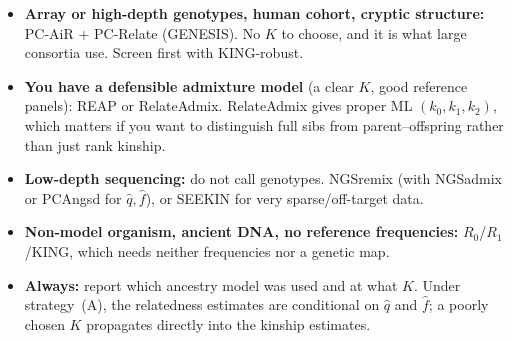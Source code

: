 \documentclass[10pt,a4paper]{article}
\newenvironment{tightitem}{%
  \begin{itemize}\setlength{\itemsep}{1pt}\setlength{\parskip}{0pt}%
  \setlength{\topsep}{3pt}\setlength{\parsep}{0pt}}{\end{itemize}}
\begin{document}
\begin{tightitem}
  \item \textbf{Array or high-depth genotypes, human cohort, cryptic structure:} PC-AiR + PC-Relate
  (GENESIS). No $K$ to choose, and it is what large consortia use. Screen first with KING-robust.
  \item \textbf{You have a defensible admixture model} (a clear $K$, good reference panels): REAP or
  RelateAdmix. RelateAdmix gives proper ML $(k_0,k_1,k_2)$, which matters if you want to distinguish
  full sibs from parent--offspring rather than just rank kinship.
  \item \textbf{Low-depth sequencing:} do not call genotypes. NGSremix (with NGSadmix or PCAngsd for
  $\hat q,\hat f$), or SEEKIN for very sparse/off-target data.
  \item \textbf{Non-model organism, ancient DNA, no reference frequencies:} $R_0$/$R_1$/KING, which needs
  neither frequencies nor a genetic map.
  \item \textbf{Always:} report which ancestry model was used and at what $K$. Under strategy~(A), the
  relatedness estimates are conditional on $\hat q$ and $\hat f$; a poorly chosen $K$ propagates directly
  into the kinship estimates.
\end{tightitem}
\end{document}
